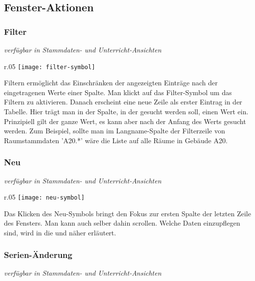 \subsection{Fenster-Aktionen}

\subsubsection{Filter}%
{\small\textit{verfügbar in Stammdaten- und Unterricht-Ansichten\\}\par}

\begin{wrapfigure}{r}{.05\textwidth}
	\vspace{-50pt}
	\texttt{[image: filter-symbol]}
	\vspace{-35pt}
\end{wrapfigure}

\noindent
Filtern ermöglicht das Einschränken der angezeigten Einträge nach der eingetragenen Werte einer Spalte. Man klickt auf das Filter-Symbol um das Filtern zu aktivieren. Danach erscheint eine neue Zeile als erster Eintrag in der Tabelle. Hier trägt man in der Spalte, in der gesucht werden soll, einen Wert ein. Prinzipiell gilt der ganze Wert, es kann aber nach der Anfang des Werts gesucht werden. Zum Beispiel, sollte man im Langname-Spalte der Filterzeile von Raumstammdaten 'A20.*' wäre die Liste auf alle Räume in Gebäude A20.

\subsubsection{Neu}
{\small\textit{verfügbar in Stammdaten- und Unterricht-Ansichten\\}\par}

\begin{wrapfigure}{r}{.05\textwidth}
	\vspace{-50pt}
	\texttt{[image: neu-symbol]}
	\vspace{-35pt}
\end{wrapfigure}

\noindent
Das Klicken des Neu-Symbols bringt den Fokus zur ersten Spalte der letzten Zeile des Fensters. Man kann auch selber dahin scrollen. Welche Daten einzupflegen sind, wird in die  und  näher erläutert.\\

\subsubsection{Serien-Änderung} 
{\small\textit{verfügbar in Stammdaten- und Unterricht-Ansichten\\}\par}

